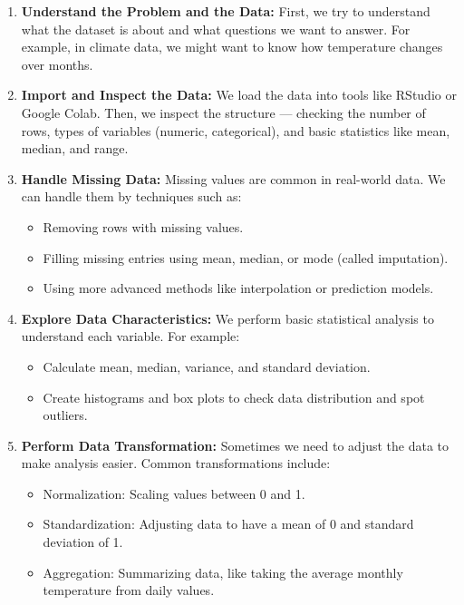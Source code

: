 \begin{enumerate}
    \item \textbf{Understand the Problem and the Data:} First, we try to understand what the dataset is about and what questions we want to answer. For example, in climate data, we might want to know how temperature changes over months.
    
    \item \textbf{Import and Inspect the Data:} We load the data into tools like RStudio or Google Colab. Then, we inspect the structure — checking the number of rows, types of variables (numeric, categorical), and basic statistics like mean, median, and range.
    
    \item \textbf{Handle Missing Data:} Missing values are common in real-world data. We can handle them by techniques such as:
    \begin{itemize}
        \item Removing rows with missing values.
        \item Filling missing entries using mean, median, or mode (called imputation).
        \item Using more advanced methods like interpolation or prediction models.
    \end{itemize}
    
    \item \textbf{Explore Data Characteristics:} We perform basic statistical analysis to understand each variable. For example:
    \begin{itemize}
        \item Calculate mean, median, variance, and standard deviation.
        \item Create histograms and box plots to check data distribution and spot outliers.
    \end{itemize}
    
    \item \textbf{Perform Data Transformation:} Sometimes we need to adjust the data to make analysis easier. Common transformations include:
    \begin{itemize}
        \item Normalization: Scaling values between 0 and 1.
        \item Standardization: Adjusting data to have a mean of 0 and standard deviation of 1.
        \item Aggregation: Summarizing data, like taking the average monthly temperature from daily values.
    \end{itemize}
    

\end{enumerate}
